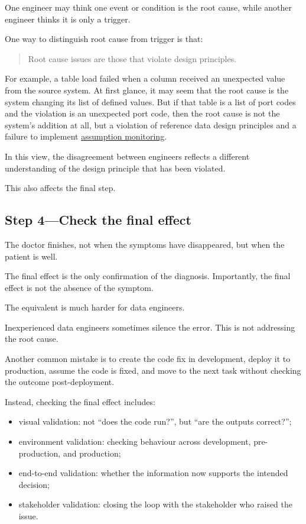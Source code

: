\documentclass[10pt,openany,10pt]{book}
\providecommand{\tightlist}{%
  \setlength{\itemsep}{0pt}\setlength{\parskip}{0pt}}
\begin{document}
One engineer may think one event or condition is the root cause, while
another engineer thinks it is only a trigger.

One way to distinguish root cause from trigger is that:

\begin{quote}
Root cause issues are those that violate design principles.
\end{quote}

For example, a table load failed when a column received an unexpected
value from the source system. At first glance, it may seem that the root
cause is the system changing its list of defined values. But if that
table is a list of port codes and the violation is an unexpected port
code, then the root cause is not the system's addition at all, but a
violation of reference data design principles and a failure to implement
\hyperref[docs-quality-reliability-tests-and-assumptions]{assumption
monitoring}.

In this view, the disagreement between engineers reflects a different
understanding of the design principle that has been violated.

This also affects the final step.

\subsection{Step 4---Check the final
effect}\label{step-4check-the-final-effect}

The doctor finishes, not when the symptoms have disappeared, but when
the patient is well.

The final effect is the only confirmation of the diagnosis. Importantly,
the final effect is not the absence of the symptom.

The equivalent is much harder for data engineers.

Inexperienced data engineers sometimes silence the error. This is not
addressing the root cause.

Another common mistake is to create the code fix in development, deploy
it to production, assume the code is fixed, and move to the next task
without checking the outcome post-deployment.

Instead, checking the final effect includes:

\begin{itemize}
\tightlist
\item
  visual validation: not ``does the code run?'', but ``are the outputs
  correct?'';
\item
  environment validation: checking behaviour across development,
  pre-production, and production;
\item
  end-to-end validation: whether the information now supports the
  intended decision;
\item
  stakeholder validation: closing the loop with the stakeholder who
  raised the issue.
\end{itemize}
\end{document}
